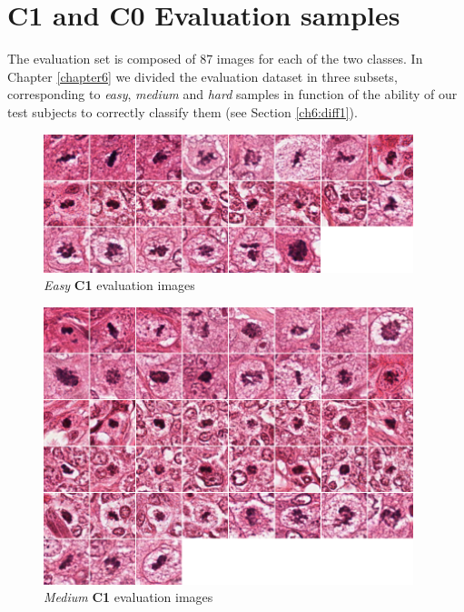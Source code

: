 \vspace{1.5cm}

\section{C1 and C0 Evaluation samples}

\label{appendixD:h_diff}

The evaluation set is composed of 87 images for each of the two classes. In Chapter \ref{chapter6} we divided the evaluation dataset in three
subsets, corresponding to \textit{easy}, \textit{medium} and \textit{hard} samples in function of the ability of our test subjects to correctly
classify them (see Section \ref{ch6:diff1}).

\begin{figure}[!hb]
 \centering
  \includegraphics[width=0.96\textwidth]{./images/dataset/C1_easy.png}
  \caption{\textit{Easy} \textbf{C1} evaluation images}
  \label{appendixD:fig3}
\end{figure}

\clearpage

\begin{figure}[!ht]
 \centering
  \includegraphics[width=0.96\textwidth]{./images/dataset/C1_med.png}
  \caption{\textit{Medium} \textbf{C1} evaluation images}
  \label{appendixD:fig4}
\end{figure}

